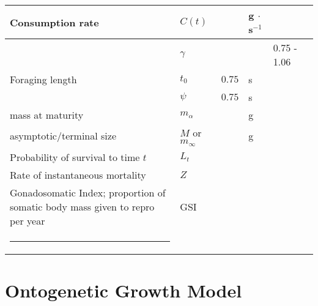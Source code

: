 \documentclass[a4paper]{article} %
\makeatletter
\newcommand{\thickhline}{%
    \noalign {\ifnum 0=`}\fi \hrule height 1pt
    \futurelet \reserved@a \@xhline
}
\makeatother
\begin{document}
\begin{table}[H]
\begin{tabularx}{\linewidth}{Xlllll}
    Consumption rate                                                                & $C(t)$               &                                & g $\cdot$ s$^{-1}$ &                  &                   \\ \hline
                                                                                    & $\gamma$             &                                & \textsc{}          & 0.75 - 1.06      &                   \\ \hline
    Foraging length                                                                 & $t_0$               & $0.75$                          & s      &                  &                   \\
                                                                                    & $\psi$               & $0.75$                         & s       &                  &                   \\ \hline
    mass at maturity                                                                & $m_{\alpha}$         &                                & g     &                  &                   \\ \hline
    asymptotic/terminal size                                                        & $M$ or $m_{\infty}$  &                                & g     &                  &                   \\ \hline
    Probability of survival to time $t$                                             & $L_t$                &                                & \textsc{}          &                  &                   \\ \hline
    Rate of instantaneous mortality                                                 & $Z$                  &                                & \textsc{}          &                  &                   \\ \hline
    Gonadosomatic Index; proportion of somatic body mass given to repro per year    & GSI                  &                                & \textsc{}          &                  &                   \\ \thickhline
    \end{tabularx}
\end{table}
\newpage

\section{Ontogenetic Growth Model}
\end{document}
